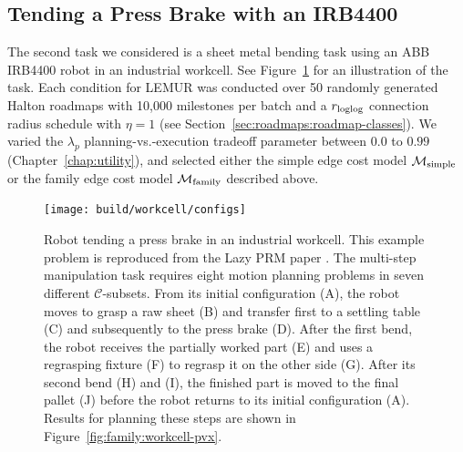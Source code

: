 
\subsection{Tending a Press Brake with an IRB4400}

The second task we considered is a sheet metal bending task
using an ABB IRB4400 robot in an industrial workcell.
See Figure~\ref{fig:family:workcell-configs}
for an illustration of the task.
Each condition for LEMUR was conducted over 50 randomly generated
Halton roadmaps with 10,000 milestones per batch
and a $r_{\mbox{\scriptsize loglog}}$ connection radius schedule with $\eta = 1$
(see Section~\ref{sec:roadmaps:roadmap-classes}).
We varied the $\lambda_p$ planning-vs.-execution tradeoff parameter
between $0.0$ to $0.99$ (Chapter~\ref{chap:utility}),
and selected either
the simple edge cost model $\mathcal{M}_{\mbox{\scriptsize simple}}$
or the family edge cost model $\mathcal{M}_{\mbox{\scriptsize family}}$
described above.

\begin{figure}
   \centering
   \texttt{[image: build/workcell/configs]}
   \caption{Robot tending a press brake in an industrial workcell.
      This example problem is reproduced from the Lazy PRM paper
      \citep{bohlin2000lazyprm}.
      The multi-step manipulation task requires eight motion planning
      problems in seven different $\mathcal{C}$-subsets.
      From its initial configuration (A),
      the robot moves to grasp a raw sheet (B)
      and transfer first to a settling table (C)
      and subsequently to the press brake (D).
      After the first bend, the robot receives the partially worked
      part (E) and uses a regrasping fixture (F)
      to regrasp it on the other side (G).
      After its second bend (H) and (I),
      the finished part is moved to the final pallet (J)
      before the robot returns to its initial configuration (A).
      Results for planning these steps are shown in
      Figure~\ref{fig:family:workcell-pvx}.}
   \label{fig:family:workcell-configs}
\end{figure}

